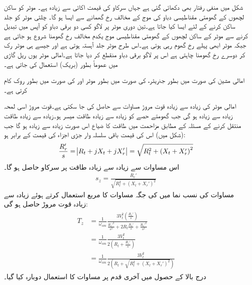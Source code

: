 شکل  میں منفی رفتار بھی دکھائی گئی ہے جہاں سرکاو کی قیمت اکائی سے زیادہ ہے۔ موٹر کو ساکن لچھوں کے گھومتی مقناطیسی دباو کی موج کے مخالف رخ گھمانے سے ایسا ہو گا۔ چلتی  موٹر کو جلد ساکن کرنے کے لئے ایسا کیا جاتا ہے۔تین دوری موٹر پر لاگو کسی دو برقی دباو کو آپس میں تبدیل کرنے سے موٹر کے ساکن لچھوں کے گھومتی مقناطیسی موج یکدم مخالف رخ گھومنا شروع ہو جاتی ہے جبکہ موٹر ابھی پہلے رخ گھوم رہی ہوتی ہے۔اس طرح موٹر جلد آہستہ ہوتی ہے اور جیسے ہی موٹر رک کر دوسرے رخ گھومنا چاہتی ہے اس پر لاگو برقی دباو منقطع کر دیا جاتا ہے۔امالی موٹر یوں ریل  گاڑی میں عموماً بطور  (بریک) استعمال کی جاتی ہے۔

امالی مشین  کی صورت میں بطور جنریٹر،  کی صورت میں بطور موٹر اور  کی صورت میں بطور روک کام کرتی ہے۔

امالی موٹر کی زیادہ سے زیادہ قوت مروڑ مساوات   سے  حاصل کی جا سکتی ہے۔قوت مروڑ اسی لمحہ زیادہ سے زیادہ ہو گی جب گھومتے حصے کو زیادہ سے زیادہ طاقت میسر ہو۔زیادہ سے زیادہ طاقت منتقل کرنے کے مسئلہ کے مطابق مزاحمت  میں طاقت کا ضیاع اس صورت زیادہ سے زیادہ ہو گا جب (شکل  میں) اس کی قیمت باقی سلسلہ وار جڑی  اجزاء کی قیمت کے برابر ہو:
\begin{align}\label{مساوات_امالی_زیادہ_طاقت_منتقلی_شرط}
\frac{R_r'}{s}=\abs{R_t+j X_t+j X_r'}=\sqrt{R_t^2+\left(X_t+X_r'\right)^2}
\end{align}
اس مساوات سے زیادہ سے زیادہ طاقت پر سرکاو  حاصل ہو گا۔
\begin{align}\label{مساوات_امالی_زیادہ_طاقت_پر_سرک}
s_z=\frac{R_r'}{\sqrt{R_t^2+\left(X_t+X_r'\right)^2}}
\end{align}
مساوات   کی نسب نما میں  کی جگہ  مساوات   کا مربع استعمال کرتے ہوئے زیادہ سے زیادہ قوت مروڑ  حاصل ہو گی:
\begin{gather}
\begin{aligned}
T_z&=\frac{1}{\omega_{sm}} \frac{3 V_t^2 \left(\frac{R_r'}{s} \right)}{\frac{R_r'^2}{s^2}+2 R_t \frac{R_r'}{s}+\frac{R_r'^2}{s^2}}\\
&=\frac{1}{\omega_{sm}} \frac{3 V_t^2 }{2 \left(R_t+\frac{R_r'}{s} \right)}\\
&=\frac{1}{\omega_{sm}} \frac{3 V_t^2}{2 \left(R_t+\sqrt{R_t^2+\left(X_t+X_r' \right)^2} \right)}
\end{aligned}
\end{gather}
درج بالا کے حصول میں آخری قدم پر مساوات  کا استعمال دوبارہ کیا گیا۔

